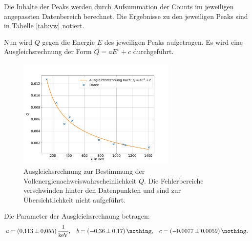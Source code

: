 Die Inhalte der Peaks werden durch Aufsummation der Counts im jeweiligen angepassten Datenbereich berechnet.
Die Ergebnisse zu den jeweiligen Peaks sind in Tabelle \ref{tab:vw} notiert.

Nun wird $Q$ gegen die Energie $E$ des jeweiligen Peaks aufgetragen.
Es wird eine Ausgleichsrechnung der Form $Q=a E^{b} + c$ durchgeführt.
\begin{figure}[h!]
  \centering
  \includegraphics[width=0.7\textwidth]{content/images/vollenergienachweiswahrscheinlichkeit.pdf}
  \caption{Ausgleichsrechnung zur Bestimmung der Vollenergienachweiswahrscheinlichkeit $Q$.
  Die Fehlerbereiche verschwinden hinter den Datenpunkten und sind zur Übersichtlichkeit nicht aufgeführt.}
  \label{fig:vw}
\end{figure}
Die Parameter der Ausgleichsrechnung betragen:
\begin{align*}
	a = \SI{0.113 (55)}{\frac{1}{\kilo \electronvolt}}, && b = \SI{-0.36 (17)}{\nothing}, && c = \SI{-0.0077 (59)}{\nothing}.
\end{align*}


